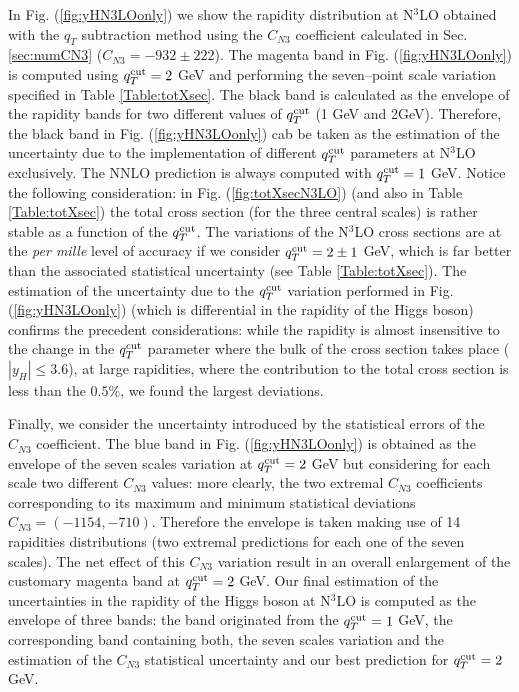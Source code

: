 \documentclass[12pt]{article}
\begin{document}
In Fig. (\ref{fig:yHN3LOonly}) we show the rapidity distribution at N$^{3}$LO obtained with the $q_{T}$ subtraction method using the $C_{N3}$ coefficient calculated in Sec. \ref{sec:numCN3} ($C_{N3}=-932 \pm 222$). The magenta band in Fig. (\ref{fig:yHN3LOonly}) is computed using $q_{T}^{\rm cut}=2$ GeV and performing the seven--point scale variation specified in Table \ref{Table:totXsec}. The black band is calculated as the envelope of the rapidity bands for two different values of $q_{T}^{\rm cut}$ (1 GeV and 2GeV). Therefore, the black band in Fig. (\ref{fig:yHN3LOonly}) cab be taken as the estimation of the uncertainty due to the implementation of different $q_{T}^{\rm cut}$ parameters at N$^{3}$LO exclusively. The NNLO prediction is always computed with $q_{T}^{\rm cut}=1$ GeV. Notice the following consideration: in Fig. (\ref{fig:totXsecN3LO}) (and also in Table \ref{Table:totXsec}) the total cross section (for the three central scales) is rather stable as a function of the $q_{T}^{\rm cut}$. The variations of the N$^{3}$LO cross sections are at the \textit{per mille} level of accuracy if we consider  $q_{T}^{\rm cut}=2 \pm 1$ GeV, which is far better than the associated statistical uncertainty (see Table \ref{Table:totXsec}). The estimation of the uncertainty due to the $q_{T}^{\rm cut}$ variation performed in Fig. (\ref{fig:yHN3LOonly}) (which is differential in the rapidity of the Higgs boson) confirms the precedent considerations: while the rapidity is almost insensitive to the change in the $q_{T}^{\rm cut}$ parameter where the bulk of the cross section takes place ($|y_{H}| \leq 3.6$), at large rapidities, where the contribution to the total cross section is less than the $0.5\%$, we found the largest deviations. 

Finally, we consider the uncertainty introduced by the statistical errors of the $C_{N3}$ coefficient. The blue band in Fig. (\ref{fig:yHN3LOonly}) is obtained as the envelope of the seven scales variation at $q_{T}^{\rm cut}=2$ GeV but considering for each scale two different $C_{N3}$ values: more clearly, the two extremal $C_{N3}$ coefficients corresponding to its maximum and minimum statistical deviations $C_{N3} =(-1154,-710)$. Therefore the envelope is taken making use of 14 rapidities distributions (two extremal predictions for each one of the seven scales). The net effect of this $C_{N3}$ variation result in an overall enlargement of the customary magenta band at $q_{T}^{\rm cut}=2$ GeV. Our final estimation of the uncertainties in the rapidity of the Higgs boson at N$^{3}$LO is computed as the envelope of three bands: the band originated from the $q_{T}^{\rm cut}=1$ GeV,  the corresponding band containing both, the seven scales variation and the estimation of the $C_{N3}$ statistical uncertainty and our best prediction for $q_{T}^{\rm cut}=2$ GeV.
\end{document}
